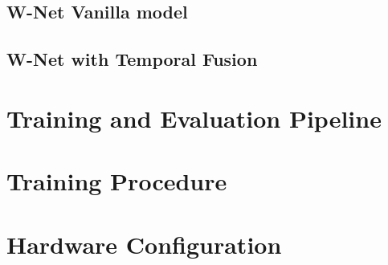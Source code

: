     \subsection{W-Net Vanilla model}
    \subsection{W-Net with Temporal Fusion}
    \section{Training and Evaluation Pipeline}
    \section{Training Procedure}
    \section{Hardware Configuration}
    

